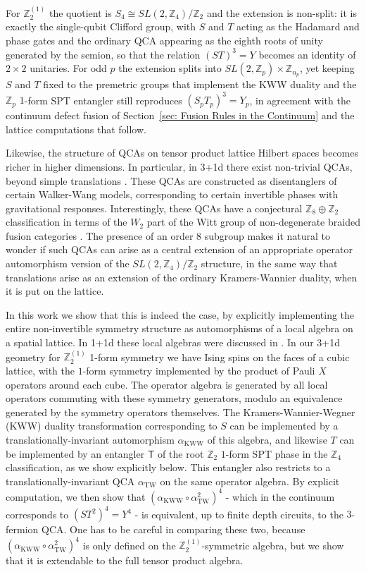\documentclass[aps,twocolumn,prx,floatfix,preprintnumbers, nofootinbib,10pt]{revtex4-2}
\numberwithin{equation}{section}
\theoremstyle{definition}
\theoremstyle{remark}
\theoremstyle{claim}
\newcommand{\aKWW}{\alpha_\text{KWW}}
\newcommand{\aTW}{\alpha_\text{TW}}
\newcommand{\Z}{{\mathbb Z}}
\renewcommand{\sf}[1]{\mathsf{#1}}
\begin{document}
For $\Z_2^{(1)}$ the quotient is $S_4\cong SL(2,\Z_4)/\Z_2$ and the extension is
non-split: it is exactly the single-qubit Clifford group, with $S$ and $T$ acting as the Hadamard and phase gates and the ordinary QCA appearing as the eighth roots of unity generated by the semion, so that the relation $(ST)^3=Y$ becomes
an identity of $2\times2$ unitaries. For odd $p$ the extension splits into $SL(2,\Z_p)\times\Z_{n_p}$, yet keeping $S$ and $T$ fixed to the premetric groups that implement the KWW duality and the $\Z_p$ $1$-form SPT entangler still reproduces $(S_pT_p)^3=Y_p$, in agreement with the continuum defect fusion of
Section~\ref{sec: Fusion Rules in the Continuum} and the lattice computations
that follow.

\noindent{\bf QCAs in 3+1d with $\Z_2^{(1)}$ 1-form Symmetry.}
Likewise, the structure of QCAs on tensor product lattice Hilbert spaces becomes richer in higher dimensions.  In particular, in 3+1d there exist non-trivial QCAs, beyond simple translations \cite{HaahFidkowskiHastings2023}.  These QCAs are constructed as disentanglers of certain Walker-Wang models, corresponding to certain invertible phases with gravitational responses.  Interestingly, these QCAs  have a conjectural $\Z_8 \oplus \Z_2$ classification in terms of the $W_2$ part of the Witt group of non-degenerate braided fusion categories \cite{Shirley_2022}.  The presence of an order $8$ subgroup makes it natural to wonder if such QCAs can arise as a central extension of an appropriate operator automorphism version of the $SL(2,\Z_4)/\Z_2$ structure, in the same way that translations arise as an extension of the ordinary Kramers-Wannier duality, when it is put on the lattice.


In this work we show that this is indeed the case, by explicitly implementing the entire non-invertible symmetry structure as automorphisms of a local algebra on a spatial lattice. 
In 1+1d these local algebras were discussed in \cite{Ma2026quantumcellular}. 
In our 3+1d geometry for $\Z_2^{(1)}$ 1-form symmetry we have Ising spins on the faces of a cubic lattice, with the $1$-form symmetry {implemented by the product of Pauli $X$ operators around each cube}. The operator algebra is generated by all local operators commuting with these symmetry generators, modulo an equivalence generated by the symmetry operators themselves. The Kramers-Wannier-Wegner (KWW) duality transformation corresponding to $S$ can be implemented by a translationally-invariant automorphism $\aKWW$ of this algebra, and likewise $T$ can be implemented by an entangler $\sf{T}$ of the root $\Z_2$ $1$-form SPT phase in the $\Z_4$ classification, as we show explicitly below. This entangler also restricts to a translationally-invariant QCA $\aTW$ on the same operator algebra. By explicit computation, we then show that $(\aKWW \circ \aTW^2)^4$ - which in the continuum corresponds to $(ST^2)^4 = Y^4$ - is equivalent, up to finite depth circuits, to the $3$-fermion QCA. One has to be careful in comparing these two, because $(\aKWW \circ \aTW^2)^4$ is only defined on the $\Z_2^{(1)}$-symmetric algebra, but we show that it is extendable to the full tensor product algebra. 
\end{document}
